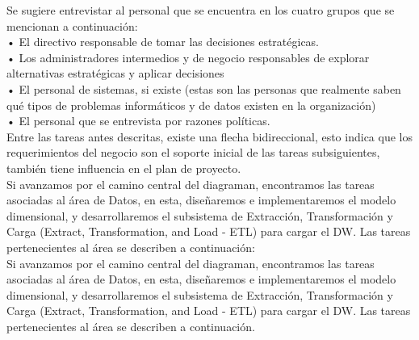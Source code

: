 Se sugiere entrevistar al personal que se encuentra en los cuatro grupos que se mencionan a continuación:\\
•	El directivo responsable de tomar las decisiones estratégicas.\\
•	Los administradores intermedios y de negocio responsables de explorar alternativas estratégicas y aplicar decisiones\\
•	El personal de sistemas, si existe (estas son las personas que realmente saben qué tipos de problemas informáticos y de datos existen en la organización)\\
•	El personal que se entrevista por razones políticas.\\
Entre las tareas antes descritas, existe una flecha bidireccional, esto indica que los requerimientos del negocio son el soporte inicial de las tareas subsiguientes, también tiene influencia en el plan de proyecto.\\
Si avanzamos por el camino central del diagraman, encontramos las tareas asociadas al área de Datos, en esta, diseñaremos e implementaremos el modelo dimensional, y desarrollaremos el subsistema de Extracción, Transformación y Carga (Extract, Transformation, and Load - ETL) para cargar el DW. Las tareas pertenecientes al área se describen a continuación:\\
Si avanzamos por el camino central del diagraman, encontramos las tareas asociadas al área de Datos, en esta, diseñaremos e implementaremos el modelo dimensional, y desarrollaremos el subsistema de Extracción, Transformación y Carga (Extract, Transformation, and Load - ETL) para cargar el DW. Las tareas pertenecientes al área se describen a continuación.\\
\\\\
